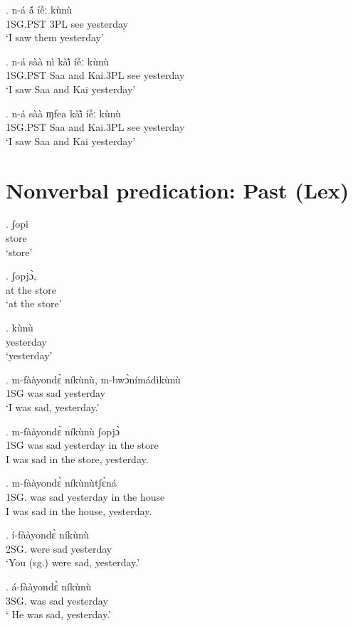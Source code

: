 \documentclass{assets/fieldnotes}
\begin{document}
{\exg. n-á á̃ íễː kùnù \\
1SG.PST 3PL see yesterday \\
    `I saw them yesterday'

\exg. n-á sàà nì kàì̃ íễː kùnù\\
1SG.PST Saa and Kai.3PL see yesterday \\
    `I saw Saa and Kai yesterday'

\exg. n-á sàà ɱfea kàì̃ íễː kùnù\\
1SG.PST Saa and Kai.3PL see yesterday \\
    `I saw Saa and Kai yesterday'



\section{Nonverbal predication: Past (Lex)}%


\exg. ʃopi\\
store\\
`store'

\exg. ʃopjɔ̀, \\
at the store\\
`at the store'

\exg. kùnù\\
yesterday\\
`yesterday'


\exg. m-fààyondɛ̀ níkùnù, m-bwɔ̀nímádìkùnù\\
1SG was sad yesterday\\
`I was sad, yesterday.'

\exg. m-fààyondɛ̀ níkùnù ʃopjɔ̀ \\
1SG was sad yesterday in the store\\
I was sad in the store, yesterday.

\exg. m-fààyondɛ̀ níkùnùtʃɛ̀ná \\
1SG. was sad yesterday in the house\\
I was sad in the house, yesterday.

\exg. í-fààyondɛ̀ níkùnù\\
2SG. were sad yesterday\\
`You (sg.) were sad, yesterday.'

\exg. á-fààyondɛ̀ níkùnù\\
3SG. was sad yesterday\\
 ` He was sad, yesterday.'
 
}
\end{document}
